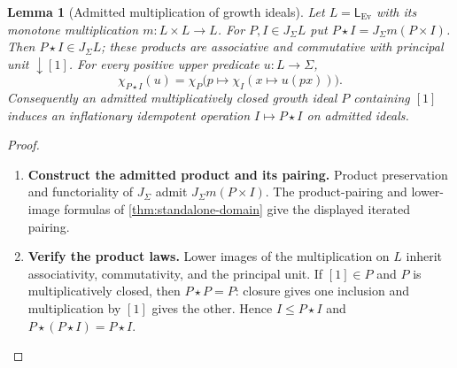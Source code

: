 \documentclass[11pt,a4paper]{article}
\numberwithin{algorithm}{section}
\numberwithin{equation}{section}
\newtheorem{lemma}[lemma]{Lemma}
\theoremstyle{definition}
\theoremstyle{remark}
\theoremstyle{plain}
\newcommand{\J}{J_{\Sigma}}
\newcommand{\Ev}{{\operatorname{Ev}}}
\theoremstyle{definition}
\theoremstyle{plain}
\begin{document}
\begin{lemma}[Admitted multiplication of growth ideals]
\label{lem:admitted-growth-product}
Let $L=\mathsf L_{\Ev}$ with its monotone multiplication
$m:L\times L\to L$. For $P,I\in\J L$ put
$P\star I=\J m(P\times I)$. Then $P\star I\in\J L$;
these products are associative and commutative with principal unit
$\downarrow[1]$. For every positive upper predicate $u:L\to\Sigma$,
\[
 \chi_{P\star I}(u)=
 \chi_P\bigl(p\mapsto\chi_I(x\mapsto u(px))\bigr).
\]
Consequently an admitted multiplicatively closed growth ideal
$P$ containing $[1]$ induces an inflationary idempotent operation
$I\mapsto P\star I$ on admitted ideals.
\end{lemma}
\begin{proof}\leavevmode
\begin{enumerate}[leftmargin=*,align=left]
\item \textbf{Construct the admitted product and its pairing.}
Product preservation and functoriality of $\J$ admit
$\J m(P\times I)$. The product-pairing and lower-image formulas of
\cref{thm:standalone-domain} give the displayed iterated pairing.

\item \textbf{Verify the product laws.}
Lower images of the multiplication on $L$ inherit associativity,
commutativity, and the principal unit. If $[1]\in P$ and $P$
is multiplicatively closed, then $P\star P=P$: closure gives one
inclusion and multiplication by $[1]$ gives the other. Hence
$I\le P\star I$ and $P\star(P\star I)=P\star I$.
\end{enumerate}
\end{proof}
\end{document}
